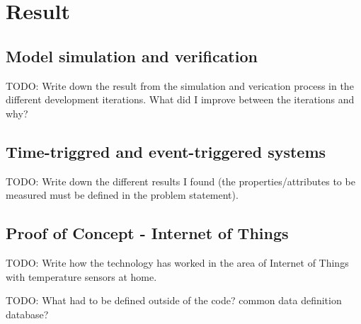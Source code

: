 \chapter{Result}\label{ch:result}
\section{Model simulation and verification}
TODO: Write down the result from the simulation and verication process in the
different development iterations. What did I improve between the iterations and
why?

\section{Time-triggred and event-triggered systems}
TODO: Write down the different results I found (the properties/attributes to be
measured must be defined in the problem statement).

\section{Proof of Concept - Internet of Things}
TODO: Write how the technology has worked in the area of Internet of Things
with temperature sensors at home.

TODO: What had to be defined outside of the code? common data definition
database?
